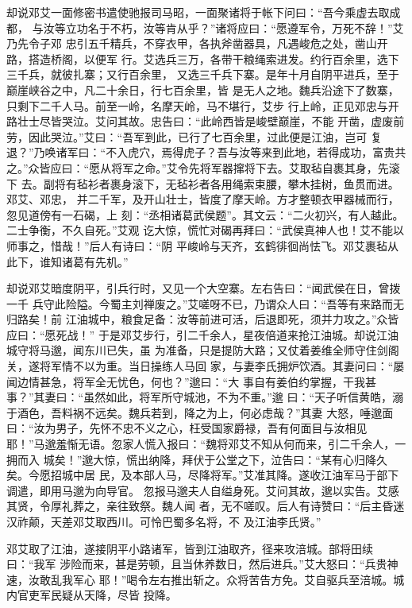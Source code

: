 却说邓艾一面修密书遣使驰报司马昭，一面聚诸将于帐下问曰：“吾今乘虚去取成都，
与汝等立功名于不朽，汝等肯从乎？”诸将应曰：“愿遵军令，万死不辞！”艾乃先令子邓
忠引五千精兵，不穿衣甲，各执斧凿器具，凡遇峻危之处，凿山开路，搭造桥阁，以便军
行。艾选兵三万，各带干粮绳索进发。约行百余里，选下三千兵，就彼扎寨；又行百余里，
又选三千兵下寨。是年十月自阴平进兵，至于巅崖峡谷之中，凡二十余日，行七百余里，皆
是无人之地。魏兵沿途下了数寨，只剩下二千人马。前至一岭，名摩天岭，马不堪行，艾步
行上岭，正见邓忠与开路壮士尽皆哭泣。艾问其故。忠告曰：“此岭西皆是峻壁巅崖，不能
开凿，虚废前劳，因此哭泣。”艾曰：“吾军到此，已行了七百余里，过此便是江油，岂可
复退？”乃唤诸军曰：“不入虎穴，焉得虎子？吾与汝等来到此地，若得成功，富贵共
之。”众皆应曰：“愿从将军之命。”艾令先将军器撺将下去。艾取毡自裹其身，先滚下
去。副将有毡衫者裹身滚下，无毡衫者各用绳索束腰，攀木挂树，鱼贯而进。邓艾、邓忠，
并二千军，及开山壮士，皆度了摩天岭。方才整顿衣甲器械而行，忽见道傍有一石碣，上
刻：“丞相诸葛武侯题”。其文云：“二火初兴，有人越此。二士争衡，不久自死。”艾观
讫大惊，慌忙对碣再拜曰：“武侯真神人也！艾不能以师事之，惜哉！”后人有诗曰：“阴
平峻岭与天齐，玄鹤徘徊尚怯飞。邓艾裹毡从此下，谁知诸葛有先机。”

却说邓艾暗度阴平，引兵行时，又见一个大空寨。左右告曰：“闻武侯在日，曾拨一千
兵守此险隘。今蜀主刘禅废之。”艾嗟呀不已，乃谓众人曰：“吾等有来路而无归路矣！前
江油城中，粮食足备：汝等前进可活，后退即死，须并力攻之。”众皆应曰：“愿死战！”
于是邓艾步行，引二千余人，星夜倍道来抢江油城。却说江油城守将马邈，闻东川已失，虽
为准备，只是提防大路；又仗着姜维全师守住剑阁关，遂将军情不以为重。当日操练人马回
家，与妻李氏拥炉饮酒。其妻问曰：“屡闻边情甚急，将军全无忧色，何也？”邈曰：“大
事自有姜伯约掌握，干我甚事？”其妻曰：“虽然如此，将军所守城池，不为不重。”邈
曰：“天子听信黄皓，溺于酒色，吾料祸不远矣。魏兵若到，降之为上，何必虑哉？”其妻
大怒，唾邈面曰：“汝为男子，先怀不忠不义之心，枉受国家爵禄，吾有何面目与汝相见
耶！”马邈羞惭无语。忽家人慌入报曰：“魏将邓艾不知从何而来，引二千余人，一拥而入
城矣！”邈大惊，慌出纳降，拜伏于公堂之下，泣告曰：“某有心归降久矣。今愿招城中居
民，及本部人马，尽降将军。”艾准其降。遂收江油军马于部下调遣，即用马邈为向导官。
忽报马邈夫人自缢身死。艾问其故，邈以实告。艾感其贤，令厚礼葬之，亲往致祭。魏人闻
者，无不嗟叹。后人有诗赞曰：“后主昏迷汉祚颠，天差邓艾取西川。可怜巴蜀多名将，不
及江油李氏贤。”

邓艾取了江油，遂接阴平小路诸军，皆到江油取齐，径来攻涪城。部将田续曰：“我军
涉险而来，甚是劳顿，且当休养数日，然后进兵。”艾大怒曰：“兵贵神速，汝敢乱我军心
耶！”喝令左右推出斩之。众将苦告方免。艾自驱兵至涪城。城内官吏军民疑从天降，尽皆
投降。

